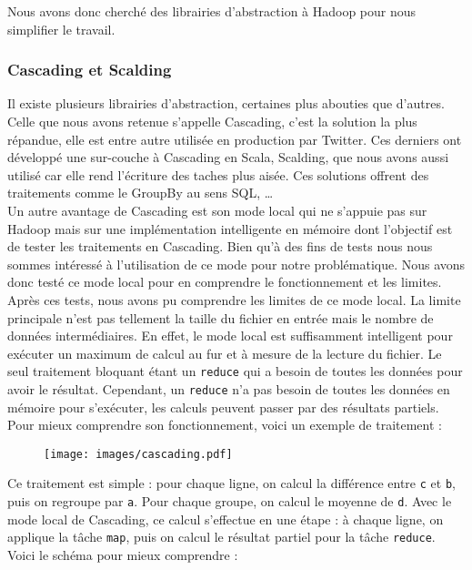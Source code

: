 Nous avons donc cherché des librairies d'abstraction à Hadoop pour nous simplifier le travail.

\subsubsection{Cascading et Scalding}

Il existe plusieurs librairies d'abstraction, certaines plus abouties que d'autres. Celle que nous avons retenue s'appelle Cascading, c'est la solution la plus répandue, elle est entre autre utilisée en production par Twitter. Ces derniers ont développé une sur-couche à Cascading en Scala, Scalding, que nous avons aussi utilisé car elle rend l'écriture des taches plus aisée. Ces solutions offrent des traitements comme le GroupBy au sens SQL, \dots{}\\

Un autre avantage de Cascading est son mode local qui ne s'appuie pas sur Hadoop mais sur une implémentation intelligente en mémoire dont l'objectif est de tester les traitements en Cascading. Bien qu'à des fins de tests nous nous sommes intéressé à l'utilisation de ce mode pour notre problématique. Nous avons donc testé ce mode local pour en comprendre le fonctionnement et les limites.\\

Après ces tests, nous avons pu comprendre les limites de ce mode local. La limite principale n'est pas tellement la taille du fichier en entrée mais le nombre de données intermédiaires. En effet, le mode local est suffisamment intelligent pour exécuter un maximum de calcul au fur et à mesure de la lecture du fichier. Le seul traitement bloquant étant un \verb+reduce+ qui a besoin de toutes les données pour avoir le résultat. Cependant, un \verb+reduce+ n'a pas besoin de toutes les données en mémoire pour s'exécuter, les calculs peuvent passer par des résultats partiels.\\

Pour mieux comprendre son fonctionnement, voici un exemple de traitement :
\begin{figure}[H]
	\centering
	\texttt{[image: images/cascading.pdf]}
\end{figure}

Ce traitement est simple : pour chaque ligne, on calcul la différence entre \verb+c+ et \verb+b+, puis on regroupe par \verb+a+. Pour chaque groupe, on calcul le moyenne de \verb+d+. Avec le mode local de Cascading, ce calcul s'effectue en une étape : à chaque ligne, on applique la tâche \verb+map+, puis on calcul le résultat partiel pour la tâche \verb+reduce+. Voici le schéma pour mieux comprendre :

